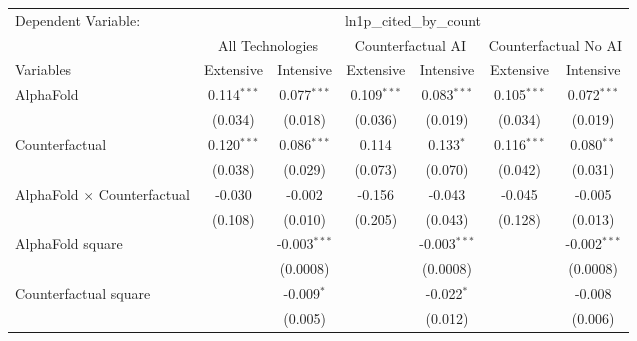 \begingroup
\centering
\begin{tabular}{lcccccc}
   \tabularnewline \midrule \midrule
   Dependent Variable: & \multicolumn{6}{c}{ln1p\_cited\_by\_count}\\
 & \multicolumn{2}{c}{All Technologies} & \multicolumn{2}{c}{Counterfactual AI} & \multicolumn{2}{c}{Counterfactual No AI} \\
\cmidrule(lr){1-1}\cmidrule(lr){2-3} \cmidrule(lr){4-5} \cmidrule(lr){6-7}
Variables & \multicolumn{1}{c}{Extensive} & \multicolumn{1}{c}{Intensive} & \multicolumn{1}{c}{Extensive} & \multicolumn{1}{c}{Intensive} & \multicolumn{1}{c}{Extensive} & \multicolumn{1}{c}{Intensive} \\
\cmidrule(lr){1-1}\cmidrule(lr){2-2} \cmidrule(lr){3-3} \cmidrule(lr){4-4} \cmidrule(lr){5-5} \cmidrule(lr){6-6} \cmidrule(lr){7-7}
   AlphaFold                          & 0.114$^{***}$ & 0.077$^{***}$  & 0.109$^{***}$ & 0.083$^{***}$  & 0.105$^{***}$ & 0.072$^{***}$\\   
                                      & (0.034)       & (0.018)        & (0.036)       & (0.019)        & (0.034)       & (0.019)\\   
   Counterfactual                     & 0.120$^{***}$ & 0.086$^{***}$  & 0.114         & 0.133$^{*}$    & 0.116$^{***}$ & 0.080$^{**}$\\   
                                      & (0.038)       & (0.029)        & (0.073)       & (0.070)        & (0.042)       & (0.031)\\   
   AlphaFold $\times$ Counterfactual  & -0.030        & -0.002         & -0.156        & -0.043         & -0.045        & -0.005\\   
                                      & (0.108)       & (0.010)        & (0.205)       & (0.043)        & (0.128)       & (0.013)\\   
   AlphaFold square                   &               & -0.003$^{***}$ &               & -0.003$^{***}$ &               & -0.002$^{***}$\\   
                                      &               & (0.0008)       &               & (0.0008)       &               & (0.0008)\\   
   Counterfactual square              &               & -0.009$^{*}$   &               & -0.022$^{*}$   &               & -0.008\\   
                                      &               & (0.005)        &               & (0.012)        &               & (0.006)\\   

\end{tabular}
